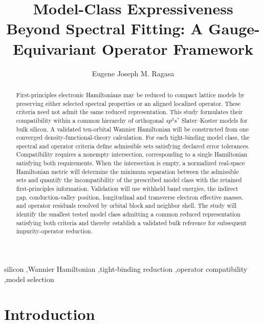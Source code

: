 \documentclass[preprint,12pt]{elsarticle}
\begin{document}
\begin{frontmatter}

\title{Model-Class Expressiveness Beyond Spectral Fitting: A Gauge-Equivariant Operator Framework}

\author[dlsu]{Eugene Joseph M. Ragasa}

\address[dlsu]{Department of Physics, De La Salle University,
2401 Taft Avenue, Manila 0922, Philippines}

\begin{abstract}
First-principles electronic Hamiltonians may be reduced to compact lattice
models by preserving either selected spectral properties or an aligned
localized operator. These criteria need not admit the same reduced
representation. This study formulates their compatibility within a common
hierarchy of orthogonal $sp^3s^{\ast}$ Slater--Koster models for bulk silicon.
A validated ten-orbital Wannier Hamiltonian will be constructed from one
converged density-functional-theory calculation. For each tight-binding model
class, the spectral and operator criteria define admissible sets satisfying
declared error tolerances. Compatibility requires a nonempty intersection,
corresponding to a single Hamiltonian satisfying both requirements. When the
intersection is empty, a normalized real-space Hamiltonian metric will
determine the minimum separation between the admissible sets and quantify the
incompatibility of the prescribed model class with the retained
first-principles information. Validation will use withheld band energies, the
indirect gap, conduction-valley position, longitudinal and transverse electron
effective masses, and operator residuals resolved by orbital block and neighbor
shell. The study will identify the smallest tested model class admitting a
common reduced representation satisfying both criteria and thereby establish
a validated bulk reference for subsequent impurity-operator reduction.
\end{abstract}

\begin{keyword}
silicon \sep Wannier Hamiltonian \sep tight-binding reduction
\sep operator compatibility \sep model selection
\end{keyword}

\end{frontmatter}

\section{Introduction}
\label{sec:introduction}
\end{document}
